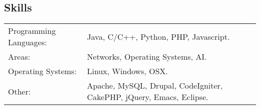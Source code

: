 \documentclass{res}
\begin{document}
\begin{resume}
\section{Skills}
\label{sec:skills}

\begin{tabular}{l l}
Programming Languages: & Java, C/C++, Python, PHP, Javascript.\\
Areas: & Networks, Operating Systems, AI.\\
Operating Systems: & Linux, Windows, OSX.\\
Other: & Apache, MySQL, Drupal, CodeIgniter, CakePHP, jQuery, Emacs, Eclipse.\\
\end{tabular}

\end{resume}
\end{document}
